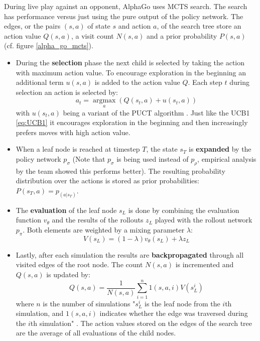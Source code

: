 During live play against an opponent, AlphaGo uses MCTS search. The search has performance versus just using the pure output of the policy network. The edges, or the pairs $(s,a)$ of state $s$ and action $a$, of the search tree store an action value $Q(s, a)$, a visit count $N(s, a)$ and a prior probability $P(s, a)$ (cf. figure \ref{alpha_go_mcts}).

\begin{itemize}
    \item During the \textbf{selection} phase the next child is selected by taking the action with maximum action value. To encourage exploration in the beginning an additional term $u(s,a)$ is added to the action value $Q$. Each step $t$ during selection an action is selected by:
          \begin{equation}
              a_t = \operatorname*{argmax}_a (Q(s_t,a) + u(s_t, a))
          \end{equation}
          with $u(s_t, a)$ being a variant of the PUCT algorithm \cite{rosin_multi-armed_2011}. Just like the UCB1 \ref{eq:UCB1} it encourages exploration in the beginning and then increasingly prefers moves with high action value.
    \item When a leaf node is reached at timestep $T$, the state $s_T$ is \textbf{expanded} by the policy network $p_{\sigma}$ (Note that $p_{\sigma}$ is being used instead of $p_{\rho}$, empirical analysis by the team showed this performs better). The resulting probability distribution over the actions is stored as prior probabilities: $P(s_T, a) = p_(a|s_T)$.
    \item The \textbf{evaluation} of the leaf node $s_L$ is done by combining the evaluation function $v_{\theta}$ and the results of the rollouts $z_L$ played with the rollout network $p_{\pi}$. Both elements are weighted by a mixing parameter $\lambda$:
          \begin{equation}
              V(s_L) = (1 - \lambda)v_{\theta}(s_L) + \lambda z_L
          \end{equation}
    \item Lastly, after each simulation the results are \textbf{backpropagated} through all visited edges of the root node. The count $N(s,a)$ is incremented and $Q(s,a)$ is updated by:
          \begin{equation}
              Q(s,a) = \frac{1}{N(s,a)}\sum_{i=1}^{n}1(s,a,i)V(s_L^i)
          \end{equation}
          where $n$ is the number of simulations "$s_L^i$ is the leaf node from the $i$th simulation, and $1(s,a,i)$ indicates whether the edge was traversed during the $i$th simulation" \cite[p. 529]{silver_mastering_2016}. The action values stored on the edges of the search tree are the average of all evaluations of the child nodes.
\end{itemize}

